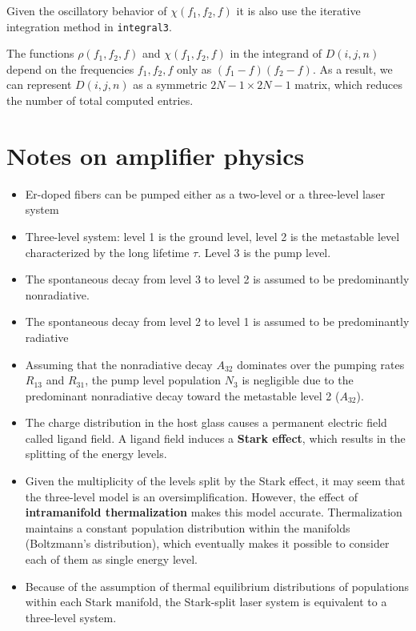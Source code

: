 \documentclass[a4paper]{article}
\begin{document}
Given the oscillatory behavior of $\chi(f_1, f_2, f)$ it is also use the iterative integration method in \texttt{integral3}.

The functions $\rho(f_1, f_2, f)$ and $\chi(f_1, f_2, f)$ in the integrand of $D(i, j, n)$ depend on the frequencies $f_1, f_2, f$ only as $(f_1-f)(f_2-f)$. As a result, we can represent $D(i, j, n)$ as a symmetric $2N-1\times 2N-1$ matrix, which reduces the number of total computed entries.

\newpage
\section{Notes on amplifier physics}

\begin{itemize}
	\item Er-doped fibers can be pumped either as a two-level or a three-level  laser system
	\item Three-level system: level 1 is the ground level, level 2 is the metastable level characterized by the long lifetime $\tau$. Level 3 is the pump level.
	\item The spontaneous decay from level 3 to level 2 is assumed to be predominantly nonradiative.
	\item The spontaneous decay from level 2 to level 1 is assumed to be predominantly radiative
	\item Assuming that the nonradiative decay $A_{32}$ dominates over the pumping rates $R_{13}$ and $R_{31}$, the pump level population $N_3$ is negligible due to the predominant nonradiative decay toward the metastable level 2 ($A_{32}$).
	\item The charge distribution in the host glass causes a permanent electric field called ligand field. A ligand field induces a \textbf{Stark effect}, which results in the splitting of the energy levels.
	\item Given the multiplicity of the levels split by the Stark effect, it may seem that the three-level model is an oversimplification. However, the effect of \textbf{intramanifold thermalization} makes this model accurate. Thermalization maintains a constant population distribution within the manifolds (Boltzmann's distribution), which eventually makes it possible to consider each of them as single
	energy level.
	\item Because of the assumption of thermal equilibrium distributions of populations within each Stark manifold, the Stark-split laser system is equivalent to a three-level system.

\end{itemize}
\end{document}
